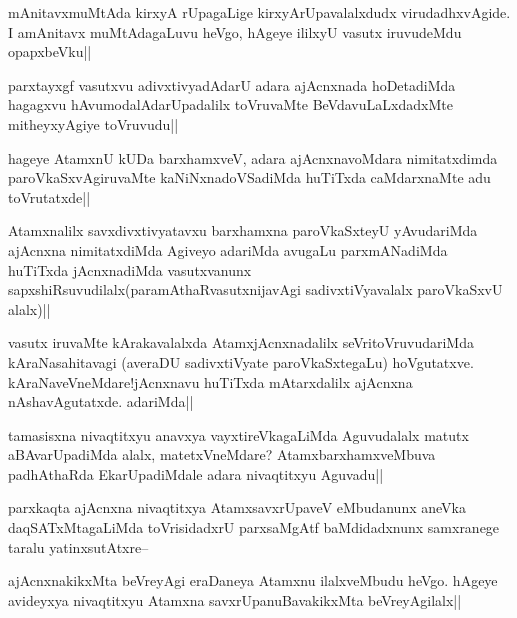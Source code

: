 
\begin{artha}
mAnitavxmuMtAda kirxyA rUpagaLige kirxyArUpavalalxdudx virudadhxvAgide. I amAnitavx muMtAdagaLuvu heVgo, hAgeye ililxyU vasutx iruvudeMdu opapxbeVku||
\end{artha}

\begin{artha}
parxtayxgf vasutxvu adivxtivyadAdarU adara ajAcnxnada hoDetadiMda hagagxvu hAvumodalAdarUpadalilx toVruvaMte BeVdavuLaLxdadxMte mitheyxyAgiye toVruvudu||
\end{artha}

\begin{artha}
hageye AtamxnU kUDa barxhamxveV, adara ajAcnxnavoMdara nimitatxdimda paroVkaSxvAgiruvaMte kaNiNxnadoVSadiMda huTiTxda caMdarxnaMte adu toVrutatxde||
\end{artha}

\begin{artha}
Atamxnalilx savxdivxtivyatavxu barxhamxna paroVkaSxteyU yAvudariMda ajAcnxna nimitatxdiMda Agiveyo adariMda avugaLu parxmANadiMda huTiTxda jAcnxnadiMda vasutxvanunx sapxshiRsuvudilalx(paramAthaRvasutxnijavAgi sadivxtiVyavalalx paroVkaSxvU alalx)||
\end{artha}

\begin{artha}
vasutx iruvaMte kArakavalalxda AtamxjAcnxnadalilx seVritoVruvudariMda kAraNasahitavagi (averaDU sadivxtiVyate paroVkaSxtegaLu) hoVgutatxve. kAraNaveVneMdare!jAcnxnavu huTiTxda mAtarxdalilx ajAcnxna nAshavAgutatxde. adariMda||
\end{artha}


\begin{artha}
tamasisxna nivaqtitxyu anavxya vayxtireVkagaLiMda Aguvudalalx matutx aBAvarUpadiMda alalx, matetxVneMdare? AtamxbarxhamxveMbuva padhAthaRda EkarUpadiMdale adara nivaqtitxyu Aguvadu||
\end{artha}

\begin{artha}
parxkaqta ajAcnxna nivaqtitxya AtamxsavxrUpaveV eMbudanunx aneVka daqSATxMtagaLiMda toVrisidadxrU parxsaMgAtf baMdidadxnunx samxranege taralu yatinxsutAtxre--
\end{artha}

\begin{artha}
ajAcnxnakikxMta beVreyAgi eraDaneya Atamxnu ilalxveMbudu heVgo. hAgeye avideyxya nivaqtitxyu Atamxna savxrUpanuBavakikxMta beVreyAgilalx||
\end{artha}

